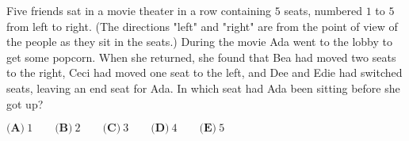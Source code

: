 \documentclass[preview]{standalone}
\begin{document}
\color{white}
Five friends sat in a movie theater in a row containing $5$ seats, numbered $1$ to $5$ from left to right. (The directions "left" and "right" are from the point of view of the people as they sit in the seats.) During the movie Ada went to the lobby to get some popcorn. When she returned, she found that Bea had moved two seats to the right, Ceci had moved one seat to the left, and Dee and Edie had switched seats, leaving an end seat for Ada. In which seat had Ada been sitting before she got up?

$\textbf{(A)}\ 1\qquad\textbf{(B)}\ 2\qquad\textbf{(C)}\ 3\qquad\textbf{(D)}\ 4\qquad\textbf{(E)}\ 5$
\end{document}

